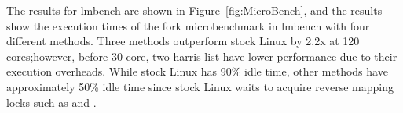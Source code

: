 The results for lmbench are shown in Figure~\ref{fig:MicroBench}, 
and the results show the execution times of the fork microbenchmark in lmbench
with four different methods.
Three methods outperform stock Linux by 2.2x at 120 cores;however, before 30
core, two harris list have lower performance due to their execution overheads.
While stock Linux has 90\% idle time, other methods have approximately 50\%
idle time since stock Linux waits to acquire reverse mapping locks such as
 and .
